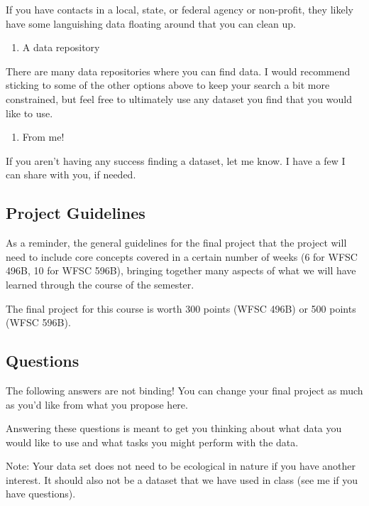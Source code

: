 \documentclass[
]{article}
\providecommand{\tightlist}{%
  \setlength{\itemsep}{0pt}\setlength{\parskip}{0pt}}
\begin{document}
If you have contacts in a local, state, or federal agency or non-profit,
they likely have some languishing data floating around that you can
clean up.

\begin{enumerate}
\def\labelenumi{\arabic{enumi}.}
\setcounter{enumi}{3}
\tightlist
\item
  A data repository
\end{enumerate}

There are many data repositories where you can find data. I would
recommend sticking to some of the other options above to keep your
search a bit more constrained, but feel free to ultimately use any
dataset you find that you would like to use.

\begin{enumerate}
\def\labelenumi{\arabic{enumi}.}
\setcounter{enumi}{4}
\tightlist
\item
  From me!
\end{enumerate}

If you aren't having any success finding a dataset, let me know. I have
a few I can share with you, if needed.

\subsection{Project Guidelines}\label{project-guidelines}

As a reminder, the general guidelines for the final project that the
project will need to include core concepts covered in a certain number
of weeks (6 for WFSC 496B, 10 for WFSC 596B), bringing together many
aspects of what we will have learned through the course of the semester.

The final project for this course is worth 300 points (WFSC 496B) or 500
points (WFSC 596B).

\subsection{Questions}\label{questions}

The following answers are not binding! You can change your final project
as much as you'd like from what you propose here.

Answering these questions is meant to get you thinking about what data
you would like to use and what tasks you might perform with the data.

Note: Your data set does not need to be ecological in nature if you have
another interest. It should also not be a dataset that we have used in
class (see me if you have questions).
\end{document}
